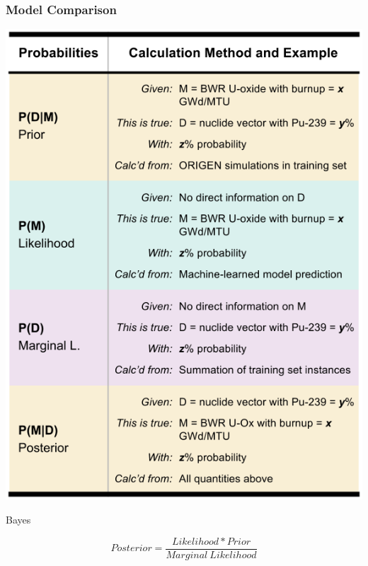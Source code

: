 \begin{frame}
  \frametitle{Model Comparison}
  \begin{minipage}{0.5\textwidth}
    \centering
    \begin{table}[h!]
      \centering
      \includegraphics[height=0.7\textheight]{./figures/bayes.png}
      \caption{Bayes}
    \end{table}
  \end{minipage}%
  \begin{minipage}{0.5\textwidth}
    \centering
    $$ Posterior = \frac{Likelihood * Prior}{Marginal \ Likelihood} $$
  \end{minipage}
\end{frame}

